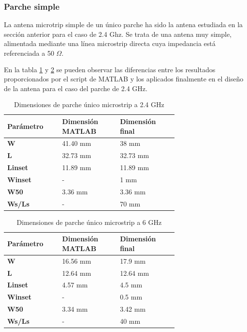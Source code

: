 \subsubsection{Parche simple} 
\par La antena microtrip simple de un único parche ha sido la antena estudiada en la sección anterior para el caso de 2.4 Ghz. Se trata de una antena muy simple, alimentada mediante una línea microstrip directa cuya impedancia está referenciada a 50 $\Omega$.
\\
\par En la tabla \ref{tab:simple1} y \ref{tab:simple2} se pueden observar las diferencias entre los resultados proporcionados por el script de MATLAB y los aplicados finalmente en el diseño de la antena para el caso del parche de 2.4 GHz.

\begin{table}[H]
  
   
   \small %
   \centering %
   \begin{tabular}{m{0.2\linewidth}m{0.25\linewidth}m{0.25\linewidth}} %
   \toprule[\heavyrulewidth]\toprule[\heavyrulewidth]
   \textbf{Parámetro} & \textbf{Dimensión MATLAB} & \textbf{Dimensión final} \\ 
   \midrule
   \textbf{W} & 41.40 mm & 38 mm \\
   \textbf{L} & 32.73 mm & 32.73 mm\\
   \textbf{Linset} & 11.89 mm & 11.89 mm\\
   \textbf{Winset} & - & 1 mm\\
   \textbf{W50} & 3.36 mm & 3.36 mm\\
   \textbf{Ws/Ls} & - & 70 mm\\
   \bottomrule[\heavyrulewidth] 
   \end{tabular}
   \caption{Dimensiones de parche único microstrip a 2.4 GHz} 
   \label{tab:simple1}
\end{table}

\begin{table}[H]
  
   
   \small %
   \centering %
   \begin{tabular}{m{0.2\linewidth}m{0.25\linewidth}m{0.25\linewidth}} %
   \toprule[\heavyrulewidth]\toprule[\heavyrulewidth]
   \textbf{Parámetro} & \textbf{Dimensión MATLAB} & \textbf{Dimensión final} \\ 
   \midrule
   \textbf{W} & 16.56 mm & 17.9 mm \\
   \textbf{L} & 12.64 mm & 12.64 mm\\
   \textbf{Linset} & 4.57 mm & 4.5 mm\\
   \textbf{Winset} & - & 0.5 mm\\
   \textbf{W50} & 3.34 mm & 3.42 mm\\
   \textbf{Ws/Ls} & - & 40 mm\\
   \bottomrule[\heavyrulewidth] 
   \end{tabular}
   \caption{Dimensiones de parche único microstrip a 6 GHz} 
   \label{tab:simple2}
\end{table}

